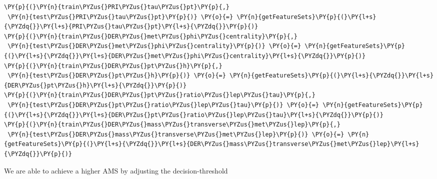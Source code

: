 {\par%
\vspace{-1\baselineskip}%
}%
\begin{notebookcell}[]%
\begin{addmargin}[\cellleftmargin]{0em}%
{\smaller%
\par%
%
\vspace{-1\smallerfontscale}%
\begin{Verbatim}[commandchars=\\\{\}]
\PY{p}{(}\PY{n}{train\PYZus{}PRI\PYZus{}tau\PYZus{}pt}\PY{p}{,}
 \PY{n}{test\PYZus{}PRI\PYZus{}tau\PYZus{}pt}\PY{p}{)} \PY{o}{=} \PY{n}{getFeatureSets}\PY{p}{(}\PY{l+s}{\PYZdq{}}\PY{l+s}{PRI\PYZus{}tau\PYZus{}pt}\PY{l+s}{\PYZdq{}}\PY{p}{)}
\PY{p}{(}\PY{n}{train\PYZus{}DER\PYZus{}met\PYZus{}phi\PYZus{}centrality}\PY{p}{,}
 \PY{n}{test\PYZus{}DER\PYZus{}met\PYZus{}phi\PYZus{}centrality}\PY{p}{)} \PY{o}{=} \PY{n}{getFeatureSets}\PY{p}{(}\PY{l+s}{\PYZdq{}}\PY{l+s}{DER\PYZus{}met\PYZus{}phi\PYZus{}centrality}\PY{l+s}{\PYZdq{}}\PY{p}{)}
\PY{p}{(}\PY{n}{train\PYZus{}DER\PYZus{}pt\PYZus{}h}\PY{p}{,}
 \PY{n}{test\PYZus{}DER\PYZus{}pt\PYZus{}h}\PY{p}{)} \PY{o}{=} \PY{n}{getFeatureSets}\PY{p}{(}\PY{l+s}{\PYZdq{}}\PY{l+s}{DER\PYZus{}pt\PYZus{}h}\PY{l+s}{\PYZdq{}}\PY{p}{)}
\PY{p}{(}\PY{n}{train\PYZus{}DER\PYZus{}pt\PYZus{}ratio\PYZus{}lep\PYZus{}tau}\PY{p}{,}
 \PY{n}{test\PYZus{}DER\PYZus{}pt\PYZus{}ratio\PYZus{}lep\PYZus{}tau}\PY{p}{)} \PY{o}{=} \PY{n}{getFeatureSets}\PY{p}{(}\PY{l+s}{\PYZdq{}}\PY{l+s}{DER\PYZus{}pt\PYZus{}ratio\PYZus{}lep\PYZus{}tau}\PY{l+s}{\PYZdq{}}\PY{p}{)}
\PY{p}{(}\PY{n}{train\PYZus{}DER\PYZus{}mass\PYZus{}transverse\PYZus{}met\PYZus{}lep}\PY{p}{,}
 \PY{n}{test\PYZus{}DER\PYZus{}mass\PYZus{}transverse\PYZus{}met\PYZus{}lep}\PY{p}{)} \PY{o}{=} \PY{n}{getFeatureSets}\PY{p}{(}\PY{l+s}{\PYZdq{}}\PY{l+s}{DER\PYZus{}mass\PYZus{}transverse\PYZus{}met\PYZus{}lep}\PY{l+s}{\PYZdq{}}\PY{p}{)}
\end{Verbatim}
%
\par%
\vspace{-1\smallerfontscale}}%
\end{addmargin}
\end{notebookcell}


    We are able to achieve a higher AMS by adjusting the decision-threshold


